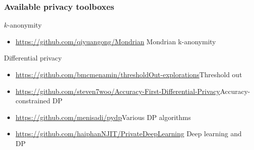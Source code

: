 \begin{frame}
  \frametitle{Available privacy toolboxes}
  \begin{block}{$k$-anonymity}
    \begin{itemize}
    \item \url{https://github.com/qiyuangong/Mondrian} Mondrian k-anonymity
    \end{itemize}
  \end{block}
  \begin{block}{Differential privacy}
    \begin{itemize}
    \item \url{https://github.com/bmcmenamin/thresholdOut-explorations}{Threshold out}
    \item \url{https://github.com/steven7woo/Accuracy-First-Differential-Privacy}{Accuracy-constrained DP}
    \item \url{https://github.com/menisadi/pydp}{Various DP algorithms}
    \item \url{https://github.com/haiphanNJIT/PrivateDeepLearning} Deep learning and DP
    \end{itemize}
  \end{block}
\end{frame}

